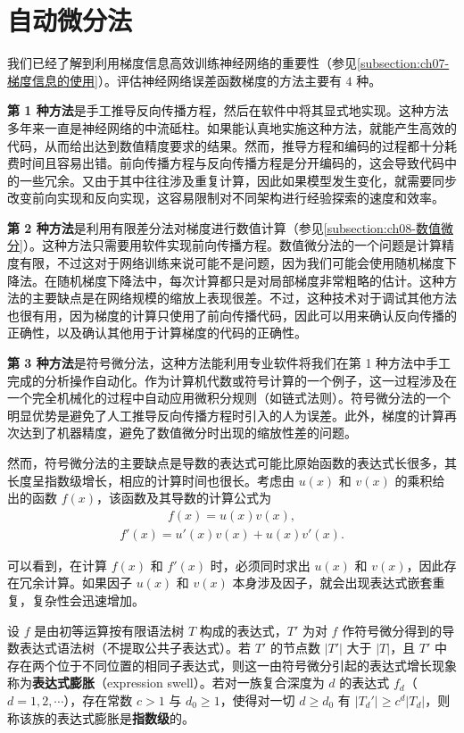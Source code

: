 \documentclass[../../main.tex]{subfiles}
\begin{document}
\section{自动微分法}\label{section:ch08-自动微分法}

我们已经了解到利用梯度信息高效训练神经网络的重要性（参见\cref{subsection:ch07-梯度信息的使用}）。评估神经网络误差函数梯度的方法主要有 $4$ 种。

\textbf{第 1 种方法}是手工推导反向传播方程，然后在软件中将其显式地实现。这种方法多年来一直是神经网络的中流砥柱。如果能认真地实施这种方法，就能产生高效的代码，从而给出达到数值精度要求的结果。然而，推导方程和编码的过程都十分耗费时间且容易出错。前向传播方程与反向传播方程是分开编码的，这会导致代码中的一些冗余。又由于其中往往涉及重复计算，因此如果模型发生变化，就需要同步改变前向实现和反向实现，这容易限制对不同架构进行经验探索的速度和效率。

\textbf{第 2 种方法}是利用有限差分法对梯度进行数值计算（参见\cref{subsection:ch08-数值微分}）。这种方法只需要用软件实现前向传播方程。数值微分法的一个问题是计算精度有限，不过这对于网络训练来说可能不是问题，因为我们可能会使用随机梯度下降法。在随机梯度下降法中，每次计算都只是对局部梯度非常粗略的估计。这种方法的主要缺点是在网络规模的缩放上表现很差。不过，这种技术对于调试其他方法也很有用，因为梯度的计算只使用了前向传播代码，因此可以用来确认反向传播的正确性，以及确认其他用于计算梯度的代码的正确性。

\textbf{第 3 种方法}是符号微分法，这种方法能利用专业软件将我们在第 1 种方法中手工完成的分析操作自动化。作为计算机代数或符号计算的一个例子，这一过程涉及在一个完全机械化的过程中自动应用微积分规则（如链式法则）。符号微分法的一个明显优势是避免了人工推导反向传播方程时引入的人为误差。此外，梯度的计算再次达到了机器精度，避免了数值微分时出现的缩放性差的问题。

然而，符号微分法的主要缺点是导数的表达式可能比原始函数的表达式长很多，其长度呈指数级增长，相应的计算时间也很长。考虑由 $u(x)$ 和 $v(x)$ 的乘积给出的函数 $f(x)$，该函数及其导数的计算公式为
\begin{align}
f(x)=u(x)v(x),
\label{align:ch08-乘积}
\end{align}
\begin{align}
f'(x)=u'(x)v(x)+u(x)v'(x).
\label{align:ch08-乘积导数}
\end{align}

可以看到，在计算 $f(x)$ 和 $f'(x)$ 时，必须同时求出 $u(x)$ 和 $v(x)$，因此存在冗余计算。如果因子 $u(x)$ 和 $v(x)$ 本身涉及因子，就会出现表达式嵌套重复，复杂性会迅速增加。

\begin{definition}[表达式膨胀]\label{definition:ch08-表达式膨胀}
设 $f$ 是由初等运算按有限语法树 $T$ 构成的表达式，$T'$ 为对 $f$ 作符号微分得到的导数表达式语法树（不提取公共子表达式）。若 $T'$ 的节点数 $|T'|$ 大于 $|T|$，且 $T'$ 中存在两个位于不同位置的相同子表达式，则这一由符号微分引起的表达式增长现象称为\textbf{表达式膨胀}（expression swell）。若对一族复合深度为 $d$ 的表达式 $f_d$（$d=1,2,\cdots$），存在常数 $c>1$ 与 $d_0\geqslant1$，使得对一切 $d\geqslant d_0$ 有 $|T_d'|\geqslant c^{d}|T_d|$，则称该族的表达式膨胀是\textbf{指数级}的。
\end{definition}
\end{document}
